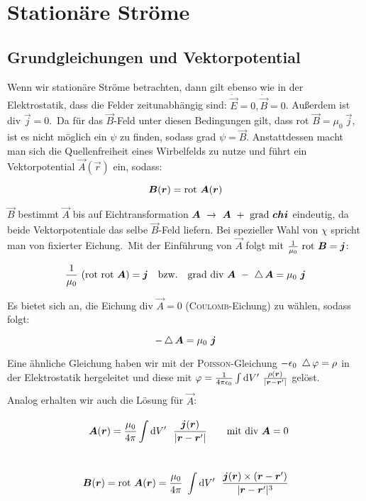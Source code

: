 \chapter{Stationäre Ströme}

\section{Grundgleichungen und Vektorpotential}

Wenn wir stationäre Ströme betrachten, dann gilt ebenso wie in der Elektrostatik, dass die Felder zeitunabhängig sind: $\dot{\vec{E}} = 0, \dot{\vec{B}}=0$. Außerdem ist div $\vec{j} = 0$.\
Da für das $\vec{B}$-Feld unter diesen Bedingungen gilt, dass rot $\vec{B} = \mu_0 \ \vec{j}$, ist es nicht möglich ein $\psi$ zu finden, sodass grad $\psi = \vec{B}$. Anstattdessen macht man sich die Quellenfreiheit eines Wirbelfelds zu nutze und führt ein Vektorpotential $\vec{A}(\vec{r})$ ein, sodass:

\begin{equation*}
\bm{B}(\bm{r}) = \text{rot } \bm{A}(\bm{r})
\end{equation*}

$\vec{B}$ bestimmt $\vec{A}$ bis auf Eichtransformation $\vec{A}\ \rightarrow \ \vec{A} \ + \ \grad \vec{chi}$ eindeutig, da beide Vektorpotentiale das selbe $\vec{B}$-Feld liefern. Bei spezieller Wahl von $\chi$ spricht man von fixierter Eichung.\
Mit der Einführung von $\vec{A}$ folgt mit $\frac{1}{\mu_0}\ \text{rot } \bm{B} = \bm{j}$:

\begin{equation*}
\frac{1}{\mu_0}\ (\rot\rot\vec{A})=\vec{j} \quad \text{bzw.} \quad \grad\div \vec{A}\ - \ \laplace\vec{A}=\mu_0 \ \vec{j}
\end{equation*}

Es bietet sich an, die Eichung div $\vec{A} = 0$ (\textsc{Coulomb}-Eichung) zu wählen, sodass folgt:

\begin{equation*}
-\laplace\vec{A}=\mu_0 \ \vec{j}
\end{equation*}

Eine ähnliche Gleichung haben wir mit der \textsc{Poisson}-Gleichung $-\epsilon_0 \ \mathop{{}\bigtriangleup}\nolimits\varphi = \rho$ in der Elektrostatik hergeleitet und diese mit $\varphi = \frac{1}{4\pi\epsilon_0}\int\limits_{{}}^{{}}\mathrm{d}{V'}\ \frac{\rho(\bm{r})}{|\bm{r}-\bm{r}'|}$ gelöst.\ \\
Analog erhalten wir auch die Lösung für $\vec{A}$:

\begin{align*}
\vec{A}(\vec{r}) = \frac{\mu_0}{4\pi}\Int{}{}{V'} \ \frac{\vec{j}(\vec{r})}{|\vec{r}-\vec{r}'|} \qquad \text{mit div }\vec{A} = 0 \\
\ \\
\vec{B}(\vec{r}) = \rot \vec{A}(\vec{r}) = \frac{\mu_0}{4\pi}\ \Int {}{}{V'} \ \frac{\vec{j}(\vec{r})\times (\vec{r}-\vec{r}')}{|\vec{r}-\vec{r}'|^3}
\end{align*}

